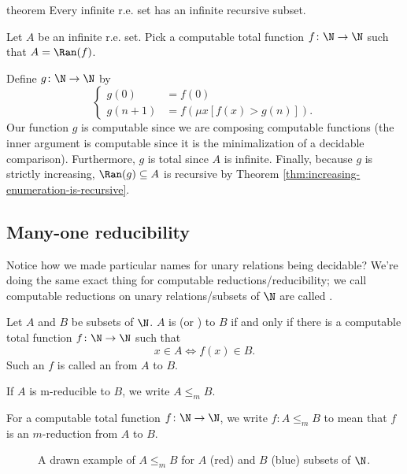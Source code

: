 \documentclass[class=article, crop=false]{standalone}
\begin{document}
\begin{result}{theorem}
  Every infinite r.e. set has an infinite recursive subset.
\end{result}
\begin{pf}
  Let $A$ be an infinite r.e. set. Pick a computable total function $f\colon \N \to \N$ such that $A = \Ran(f)$.

  Define $g\colon \N \to \N$ by
    \[
      \begin{cases}
        g(0) &= f(0) \\
        g(n+1) &= f(\mu x [f(x) > g(n)]).
      \end{cases}
    \]
  Our function $g$ is computable since we are composing computable functions (the inner argument is computable since it is the minimalization of a decidable comparison). Furthermore, $g$ is total since $A$ is infinite. Finally, because $g$ is strictly increasing, $\Ran(g) \subseteq A$ is recursive by Theorem \ref{thm:increasing-enumeration-is-recursive}.
\end{pf}









\subsection{Many-one reducibility}

Notice how we made particular names for unary relations being decidable? We're doing the same exact thing for computable reductions/reducibility; we call computable reductions on unary relations/subsets of $\N$ are called .

\begin{defn}
  Let $A$ and $B$ be subsets of $\N$. $A$ is  (or ) to $B$ if and only if there is a computable total function $f\colon \N \to \N$ such that
    \[
      x \in A \iff f(x) \in B.
    \]
  Such an $f$ is called an  from $A$ to $B$.

  If $A$ is m-reducible to $B$, we write $A \leq_m B$.

  For a computable total function $f\colon \N \to \N$, we write $f\colon A \leq_m B$ to mean that $f$ is an $m$-reduction from $A$ to $B$.
\end{defn}

\begin{figure}[ht]
  \center
  \caption{A drawn example of $A \leq_m B$ for $A$ (red) and $B$ (blue) subsets of $\N$.}
  \label{fig:many-one-reducibility}
\end{figure}
\end{document}
